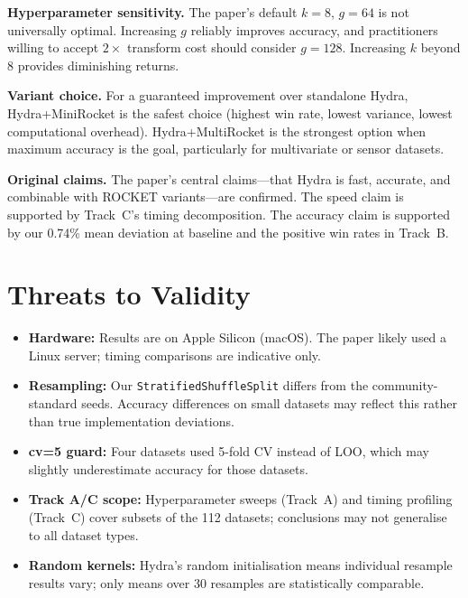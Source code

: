\documentclass[conference]{IEEEtran}
\begin{document}
\textbf{Hyperparameter sensitivity.}
The paper's default $k{=}8$, $g{=}64$ is not universally optimal. Increasing
$g$ reliably improves accuracy, and practitioners willing to accept $2\times$
transform cost should consider $g{=}128$. Increasing $k$ beyond 8 provides
diminishing returns.

\textbf{Variant choice.}
For a guaranteed improvement over standalone Hydra, Hydra+MiniRocket
is the safest choice (highest win rate, lowest variance, lowest computational
overhead). Hydra+MultiRocket is the strongest option when maximum accuracy
is the goal, particularly for multivariate or sensor datasets.

\textbf{Original claims.}
The paper's central claims---that Hydra is fast, accurate, and combinable
with ROCKET variants---are confirmed. The speed claim is supported by
Track~C's timing decomposition. The accuracy claim is supported by our
0.74\% mean deviation at baseline and the positive win rates in Track~B.

\section{Threats to Validity}

\begin{itemize}
  \item \textbf{Hardware:} Results are on Apple Silicon (macOS). The paper
        likely used a Linux server; timing comparisons are indicative only.
  \item \textbf{Resampling:} Our \texttt{StratifiedShuffleSplit} differs
        from the community-standard seeds. Accuracy differences on small
        datasets may reflect this rather than true implementation deviations.
  \item \textbf{cv=5 guard:} Four datasets used 5-fold CV instead of LOO,
        which may slightly underestimate accuracy for those datasets.
  \item \textbf{Track A/C scope:} Hyperparameter sweeps (Track~A) and
        timing profiling (Track~C) cover subsets of the 112 datasets;
        conclusions may not generalise to all dataset types.
  \item \textbf{Random kernels:} Hydra's random initialisation means
        individual resample results vary; only means over 30 resamples
        are statistically comparable.
\end{itemize}
\end{document}
